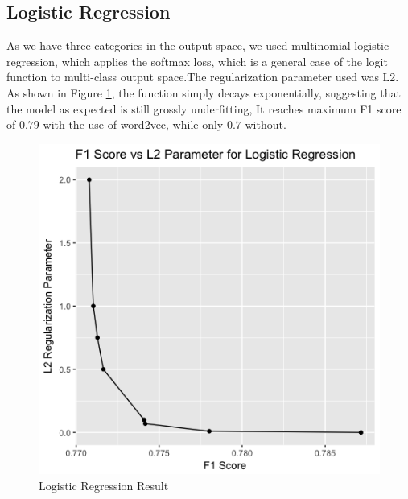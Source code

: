 \documentclass[letterpaper, 12 pt, conference]{ieeeconf}  %
\begin{document}
\subsection{Logistic Regression}
As we have three categories in the output space, we used multinomial logistic regression, which applies the softmax loss, which is a general case of the logit function to multi-class output space.The regularization parameter used was L2. As shown in Figure \ref{logit_plot}, the function simply decays exponentially, suggesting that the model as expected is still grossly underfitting, It reaches maximum F1 score of $0.79$ with the use of word2vec, while only $0.7$ without.
\begin{figure}[h]
	\centering
	\includegraphics[scale=0.5]{logit_plot.png}
	\caption{Logistic Regression Result}
    \label{logit_plot}
\end{figure}
\end{document}
